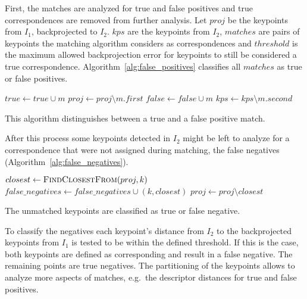 First, the matches are analyzed for true and false positives and true correspondences are removed from further analysis. 
Let $proj$ be the keypoints from $I_1$, backprojected to $I_2$.
$kps$ are the keypoints from $I_2$, $matches$ are pairs of keypoints the matching algorithm considers as correspondences and $threshold$ is the maximum allowed backprojection error for keypoints to still be considered a true correspondence.
Algorithm~\ref{alg:false_positives} classifies all $matches$ as true or false positives.
\begin{algorithm}[H]
\footnotesize
\begin{algorithmic}[0]
        \State$true \gets true \cup m$
        \State$proj \gets proj \setminus m.first$
    \Else%
        \State$false \gets false \cup m$
    \EndIf%
    \State$kps \gets kps \setminus m.second$
    \EndFor%
    \EndFunction%
\end{algorithmic}
\caption{This algorithm distinguishes between a true and a false positive match.}\label{alg:false_positives}
\end{algorithm}
After this process some keypoints detected in $I_2$ might be left to analyze for a correspondence that were not assigned during matching, the false negatives (Algorithm~\ref{alg:false_negatives}).
\begin{algorithm}[H]
\footnotesize
\begin{algorithmic}
        \State$closest \gets \Call{FindClosestFrom}{proj, k}$
            \State$false\_negatives \gets false\_negatives \cup (k, closest)$
            \State$proj \gets proj \setminus closest$
        \EndIf
    \EndFor%
    \EndFunction%
\end{algorithmic}
\caption{The unmatched keypoints are classified as true or false negative.}\label{alg:false_negatives}
\end{algorithm}
To classify the negatives each keypoint's distance from $I_2$ to the backprojected keypoints from $I_1$ is tested to be within the defined threshold.
If this is the case, both keypoints are defined as corresponding and result in a false negative. The remaining points are true negatives.
The partitioning of the keypoints allows to analyze more aspects of matches, e.g.~the descriptor distances for true and false positives.

